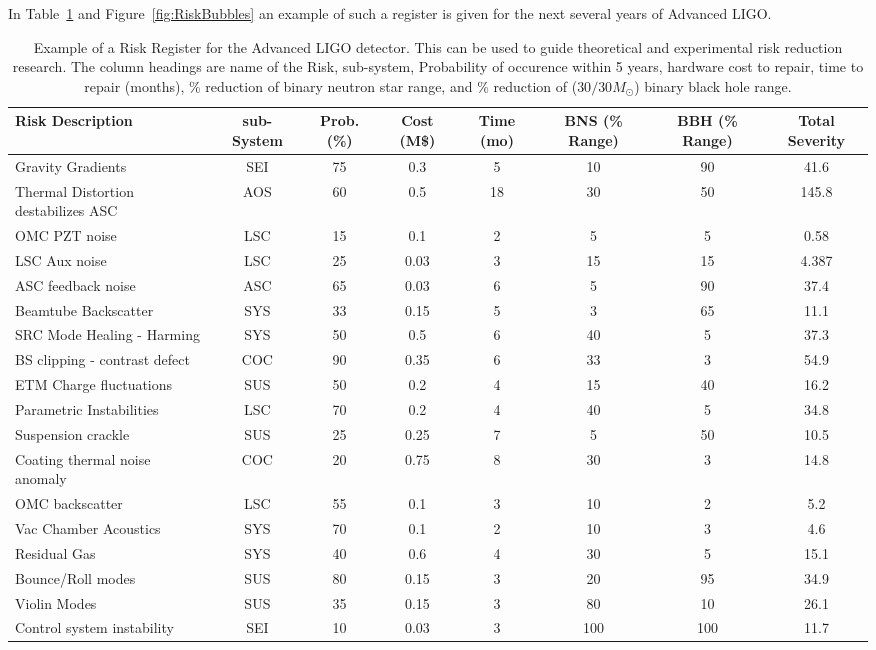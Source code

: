 In Table~\ref{t:IDC:Risk} and Figure~\ref{fig:RiskBubbles} an example of such
a register is given for the next several years of Advanced LIGO.

\begin{table}
\tiny
\begin{tabular}{ | l | c | c | c | c | c | c | c | }
\hline
	Risk Description & sub-System & Prob. (\%) & Cost (M\$) & Time (mo) & BNS (\% Range) & BBH (\% Range) & Total Severity \\ \hline
	Gravity Gradients & SEI & 75 & 0.3 & 5 & 10 & 90 & 41.6 \\ \hline
	Thermal Distortion destabilizes ASC & AOS & 60 & 0.5 & 18 & 30 & 50 & 145.8 \\ \hline
	OMC PZT noise & LSC & 15 & 0.1 & 2 & 5 & 5 & 0.58 \\ \hline
	LSC Aux noise & LSC & 25 & 0.03 & 3 & 15 & 15 & 4.387 \\ \hline
	ASC feedback noise & ASC & 65 & 0.03 & 6 & 5 & 90 & 37.4 \\ \hline
	Beamtube Backscatter & SYS & 33 & 0.15 & 5 & 3 & 65 & 11.1 \\ \hline
	SRC Mode Healing - Harming & SYS & 50 & 0.5 & 6 & 40 & 5 & 37.3 \\ \hline
	BS clipping - contrast defect & COC & 90 & 0.35 & 6 & 33 & 3 & 54.9 \\ \hline
	ETM Charge fluctuations & SUS & 50 & 0.2 & 4 & 15 & 40 & 16.2 \\ \hline
	Parametric Instabilities & LSC & 70 & 0.2 & 4 & 40 & 5 & 34.8 \\ \hline
	Suspension crackle & SUS & 25 & 0.25 & 7 & 5 & 50 & 10.5 \\ \hline
	Coating thermal noise anomaly & COC & 20 & 0.75 & 8 & 30 & 3 & 14.8 \\ \hline
	OMC backscatter & LSC & 55 & 0.1 & 3 & 10 & 2 & 5.2 \\ \hline
	Vac Chamber Acoustics & SYS & 70 & 0.1 & 2 & 10 & 3 & 4.6 \\ \hline
	Residual Gas & SYS & 40 & 0.6 & 4 & 30 & 5 & 15.1 \\ \hline
	Bounce/Roll modes & SUS & 80 & 0.15 & 3 & 20 & 95 & 34.9 \\ \hline
	Violin Modes & SUS & 35 & 0.15 & 3 & 80 & 10 & 26.1 \\ \hline
	Control system instability & SEI & 10 & 0.03 & 3 & 100 & 100 & 11.7 \\ \hline
\end{tabular}

\caption{Example of a Risk Register for the Advanced LIGO detector. This can be used to guide theoretical and experimental risk reduction research. The column headings are
name of the Risk, sub-system, Probability of occurence within 5 years, hardware
cost to repair, time to repair (months), \% reduction of binary neutron star range,
and \% reduction of ($30/30 M_{\odot}$) binary black hole range.}
\label{t:IDC:Risk}
\end{table}


